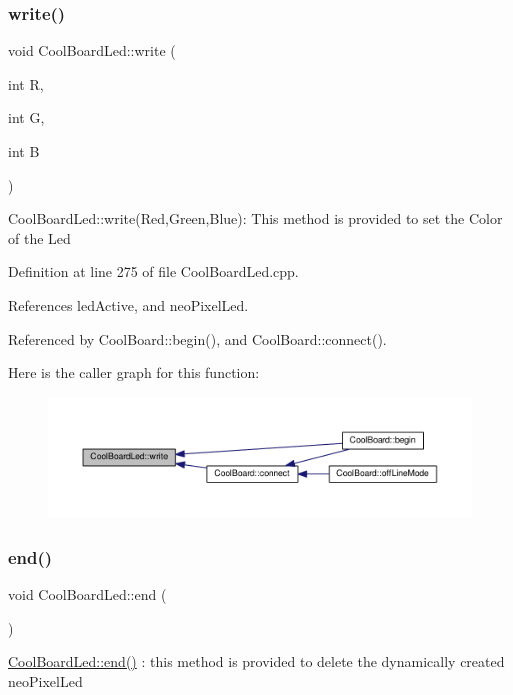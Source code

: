 \subsubsection{\texorpdfstring{write()}{write()}}
{\footnotesize\ttfamily void Cool\+Board\+Led\+::write (\begin{DoxyParamCaption}\item[{int}]{R,  }\item[{int}]{G,  }\item[{int}]{B }\end{DoxyParamCaption})}

Cool\+Board\+Led\+::write(\+Red,\+Green,\+Blue)\+: This method is provided to set the Color of the Led 

Definition at line 275 of file Cool\+Board\+Led.\+cpp.



References led\+Active, and neo\+Pixel\+Led.



Referenced by Cool\+Board\+::begin(), and Cool\+Board\+::connect().

Here is the caller graph for this function\+:
\nopagebreak
\begin{figure}[H]
\begin{center}
\leavevmode
\includegraphics[width=350pt]{de/dc0/class_cool_board_led_a30fadd4cbec17ceea428bf7a32207e87_icgraph}
\end{center}
\end{figure}
\mbox{\label{class_cool_board_led_a69f323359e0c9f797422f2152b5d41ef}} 
\subsubsection{\texorpdfstring{end()}{end()}}
{\footnotesize\ttfamily void Cool\+Board\+Led\+::end (\begin{DoxyParamCaption}{ }\end{DoxyParamCaption})}

\hyperlink{class_cool_board_led_a69f323359e0c9f797422f2152b5d41ef}{Cool\+Board\+Led\+::end()} \+: this method is provided to delete the dynamically created neo\+Pixel\+Led 

